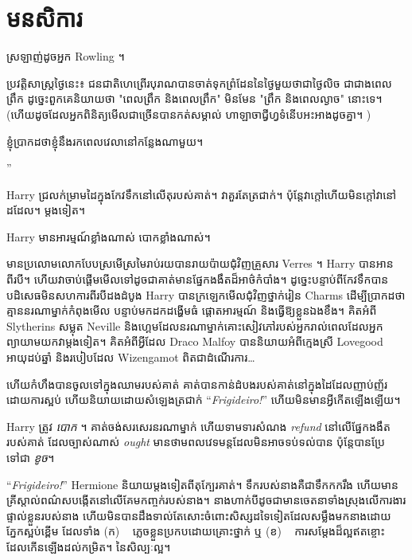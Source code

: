 \chapter{មនសិការ}

\begin{chapterOpeningAuthorNote}
ស្រឡាញ់ដូចអ្នក Rowling ។

ប្រវតិ្តសាស្រ្តថ្ងៃនេះ៖ ជនជាតិហេព្រើរបុរាណបានចាត់ទុកព្រំដែននៃថ្ងៃមួយថាជាថ្ងៃលិច ជាជាងពេលព្រឹក ដូច្នេះពួកគេនិយាយថា "ពេលព្រឹក និងពេលព្រឹក" មិនមែន "ព្រឹក និងពេលល្ងាច" នោះទេ។ (ហើយ​ដូច​ដែល​អ្នក​ពិនិត្យ​មើល​ជា​ច្រើន​បាន​កត់​សម្គាល់ ហាឡាចា​ជ្វីហ្វ​ទំនើប​អះអាង​ដូច​គ្នា។ )
\end{chapterOpeningAuthorNote}
\begin{chapterOpeningQuote}
ខ្ញុំប្រាកដថាខ្ញុំនឹងរកពេលវេលានៅកន្លែងណាមួយ។
\end{chapterOpeningQuote}

”

\hplettrineextrapara
Harry ជ្រលក់ម្រាមដៃក្នុងកែវទឹកនៅលើតុរបស់គាត់។ វាគួរតែត្រជាក់។ ប៉ុន្តែ​វា​ក្តៅ​ហើយ​មិន​ក្តៅ​វា​នៅ​ដដែល។ ម្តងទៀត។

Harry មានអារម្មណ៍ខ្លាំងណាស់ បោកខ្លាំងណាស់។

មានប្រលោមលោកបែបស្រមើស្រមៃរាប់រយបានរាយប៉ាយជុំវិញគ្រួសារ Verres ។ Harry បានអានពីរបី។ ហើយវាចាប់ផ្តើមមើលទៅដូចជាគាត់មានផ្នែកងងឹតដ៏អាថ៌កំបាំង។ ដូច្នេះបន្ទាប់ពីកែវទឹកបានបដិសេធមិនសហការពីរបីដងដំបូង Harry បានក្រឡេកមើលជុំវិញថ្នាក់រៀន Charms ដើម្បីប្រាកដថាគ្មាននរណាម្នាក់កំពុងមើល បន្ទាប់មកដកដង្ហើមធំ ផ្តោតអារម្មណ៍ និងធ្វើឱ្យខ្លួនឯងខឹង។ គិតអំពី Slytherins សម្លុត Neville និងហ្គេមដែលនរណាម្នាក់គោះសៀវភៅរបស់អ្នករាល់ពេលដែលអ្នកព្យាយាមយកវាម្តងទៀត។ គិតអំពីអ្វីដែល Draco Malfoy បាននិយាយអំពីក្មេងស្រី Lovegood អាយុដប់ឆ្នាំ និងរបៀបដែល Wizengamot ពិតជាដំណើរការ…

ហើយ​កំហឹង​បាន​ចូល​ទៅ​ក្នុង​ឈាម​របស់​គាត់ គាត់​បាន​កាន់​ដំបង​របស់​គាត់​នៅ​ក្នុង​ដៃ​ដែល​ញាប់​ញ័រ​ដោយ​ការ​ស្អប់ ហើយ​និយាយ​ដោយ​សំឡេង​ត្រជាក់ “\emph{Frigideiro!}” ហើយ​មិន​មាន​អ្វី​កើត​ឡើង​ឡើយ។

Harry ត្រូវ \emph{ បោក } ។ គាត់ចង់សរសេរនរណាម្នាក់ ហើយទាមទារសំណង \emph{refund} នៅលើផ្នែកងងឹតរបស់គាត់ ដែលច្បាស់ណាស់ \emph{ought} មានថាមពលវេទមន្តដែលមិនអាចទប់ទល់បាន ប៉ុន្តែបានប្រែទៅជា \emph{ខូច}។

“\emph{Frigideiro!}” Hermione និយាយម្តងទៀតពីតុក្បែរគាត់។ ទឹក​របស់​នាង​គឺ​ជា​ទឹកកក​រឹង ហើយ​មាន​គ្រីស្តាល់​ពណ៌​ស​បង្កើត​នៅ​លើ​គែម​កញ្ចក់​របស់​នាង។ នាងហាក់បីដូចជាមានចេតនាទាំងស្រុងលើការងារផ្ទាល់ខ្លួនរបស់នាង ហើយមិនបានដឹងទាល់តែសោះចំពោះសិស្សដទៃទៀតដែលសម្លឹងមកនាងដោយភ្នែកស្អប់ខ្ពើម ដែលទាំង (ក) ~ ភ្លេចខ្លួនប្រកបដោយគ្រោះថ្នាក់ ឬ (ខ) ~ ការសម្តែងដ៏ល្អឥតខ្ចោះដែលកើនឡើងដល់កម្រិត។ នៃសិល្បៈល្អ។

